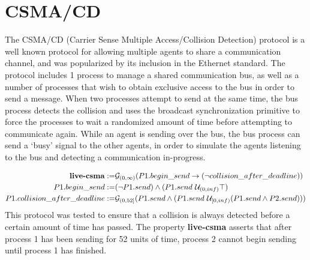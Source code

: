 \documentclass[a4paper,11pt]{report}
\theoremstyle{definition}
\begin{document}
\section{CSMA/CD}\label{evaluation-csma}

The CSMA/CD (Carrier Sense Multiple Access/Collision Detection) protocol is a
well known protocol for allowing multiple agents to share a communication
channel, and was popularized by its inclusion in the Ethernet standard. The
protocol includes 1 process to manage a shared communication bus, as well as a
number of processes that wish to obtain exclusive access to the bus in order to
send a message. When two processes attempt to send at the same time, the bus
process detects the collision and uses the broadcast synchronization primitive
to force the processes to wait a randomized amount of time before attempting to
communicate again. While an agent is sending over the bus, the bus process can
send a `busy' signal to the other agents, in order to simulate the agents
listening to the bus and detecting a communication in-progress.

\begin{align*}
  \text{\textbf{live-csma}} := & \mathcal{G}_{(0,\infty)}(P1.begin\_send \rightarrow (\neg collision\_after\_deadline)) \\
  P1.begin\_send := & (\neg P1.send) \land (P1.send\ \mathcal{U}_{(0,inf)} \top) \\
  P1.collision\_after\_deadline := & \mathcal{G}_{(0,52]}(P1.send \land (P1.send\ \mathcal{U}_{[0,inf)} (P1.send \land P2.send))) \\
\end{align*}
This protocol was tested to ensure that a collision is always detected before a
certain amount of time has passed.
The property \textbf{live-csma} asserts that after process 1 has been sending
for 52 units of time, process 2 cannot begin sending until process 1 has finished.
\end{document}
